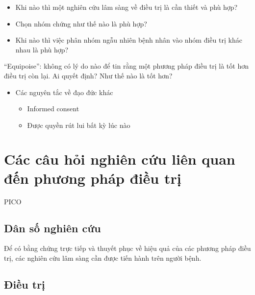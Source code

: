 \documentclass[
]{book}
\providecommand{\tightlist}{%
  \setlength{\itemsep}{0pt}\setlength{\parskip}{0pt}}
\begin{document}
\begin{itemize}
\item
  Khi nào thì một nghiên cứu lâm sàng về điều trị là cần thiết và phù hợp?
\item
  Chọn nhóm chứng như thế nào là phù hợp?
\item
  Khi nào thì việc phân nhóm ngẫu nhiên bệnh nhân vào nhóm điều trị khác nhau là phù hợp?
\end{itemize}

``Equipoise'': không có lý do nào để tin rằng một phương pháp điều trị là tốt hơn điều trị còn lại. Ai quyết định? Như thế nào là tốt hơn?

\begin{itemize}
\tightlist
\item
  Các nguyên tắc về đạo đức khác

  \begin{itemize}
  \tightlist
  \item
    Informed consent
  \item
    Được quyền rút lui bất kỳ lúc nào
  \end{itemize}
\end{itemize}

\hypertarget{cuxe1c-cuxe2u-hux1ecfi-nghiuxean-cux1ee9u-liuxean-quan-ux111ux1ebfn-phux1b0ux1a1ng-phuxe1p-ux111iux1ec1u-trux1ecb}{%
\section{Các câu hỏi nghiên cứu liên quan đến phương pháp điều trị}\label{cuxe1c-cuxe2u-hux1ecfi-nghiuxean-cux1ee9u-liuxean-quan-ux111ux1ebfn-phux1b0ux1a1ng-phuxe1p-ux111iux1ec1u-trux1ecb}}

PICO

\hypertarget{duxe2n-sux1ed1-nghiuxean-cux1ee9u}{%
\subsection{Dân số nghiên cứu}\label{duxe2n-sux1ed1-nghiuxean-cux1ee9u}}

Để có bằng chứng trực tiếp và thuyết phục về hiệu quả của các phương pháp điều trị, các nghiên cứu lâm sàng cần được tiến hành trên người bệnh.

\hypertarget{ux111iux1ec1u-trux1ecb}{%
\subsection{Điều trị}\label{ux111iux1ec1u-trux1ecb}}
\end{document}
